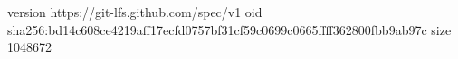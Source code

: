 version https://git-lfs.github.com/spec/v1
oid sha256:bd14c608ce4219aff17ecfd0757bf31cf59c0699c0665ffff362800fbb9ab97c
size 1048672
